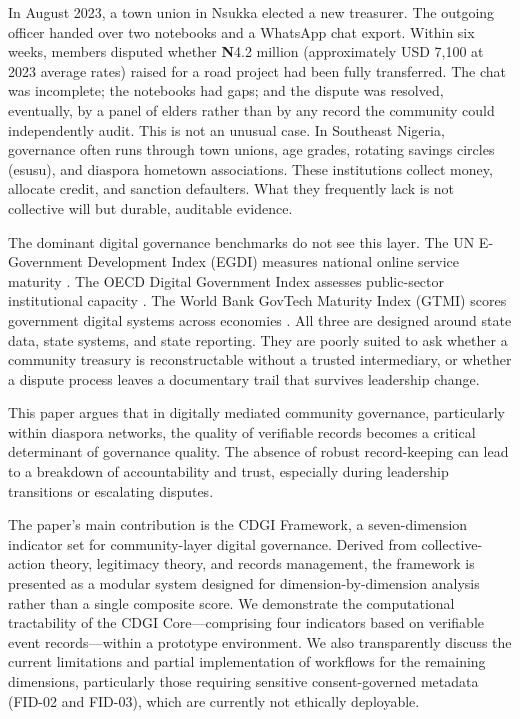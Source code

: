 \documentclass[sigconf,anonymous]{acmart}
\begin{document}
In August 2023, a town union in Nsukka elected a new treasurer. The outgoing officer handed over two notebooks and a WhatsApp chat export. Within six weeks, members disputed whether \textbf{N}4.2 million (approximately USD 7,100 at 2023 average rates) raised for a road project had been fully transferred. The chat was incomplete; the notebooks had gaps; and the dispute was resolved, eventually, by a panel of elders rather than by any record the community could independently audit. This is not an unusual case. In Southeast Nigeria, governance often runs through town unions, age grades, rotating savings circles (esusu), and diaspora hometown associations. These institutions collect money, allocate credit, and sanction defaulters. What they frequently lack is not collective will but durable, auditable evidence.

The dominant digital governance benchmarks do not see this layer. The UN E-Government Development Index (EGDI) measures national online service maturity \cite{un2022}. The OECD Digital Government Index assesses public-sector institutional capacity \cite{oecd2020}. The World Bank GovTech Maturity Index (GTMI) scores government digital systems across economies \cite{wb2021}. All three are designed around state data, state systems, and state reporting. They are poorly suited to ask whether a community treasury is reconstructable without a trusted intermediary, or whether a dispute process leaves a documentary trail that survives leadership change.

This paper argues that in digitally mediated community governance, particularly within diaspora networks, the quality of verifiable records becomes a critical determinant of governance quality. The absence of robust record-keeping can lead to a breakdown of accountability and trust, especially during leadership transitions or escalating disputes.

The paper’s main contribution is the CDGI Framework, a seven-dimension indicator set for community-layer digital governance. Derived from collective-action theory, legitimacy theory, and records management, the framework is presented as a modular system designed for dimension-by-dimension analysis rather than a single composite score. We demonstrate the computational tractability of the CDGI Core—comprising four indicators based on verifiable event records—within a prototype environment. We also transparently discuss the current limitations and partial implementation of workflows for the remaining dimensions, particularly those requiring sensitive consent-governed metadata (FID-02 and FID-03), which are currently not ethically deployable.
\end{document}
